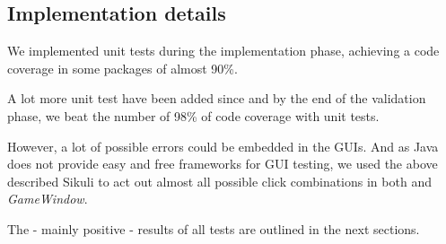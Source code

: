 \subsection{Implementation details}
We implemented unit tests during the implementation phase, achieving a code coverage in some packages of almost 90\%.\par
A lot more unit test have been added since and by the end of the validation phase, we beat the number of 98\% of code coverage with unit tests.\par
However, a lot of possible errors could be embedded in the GUIs. And as Java does not provide easy and free frameworks for GUI testing, we used the above described Sikuli to act out almost all possible click combinations in both \gameexplorer and \emph{GameWindow}.\par
The - mainly positive - results of all tests are outlined in the next sections.\par